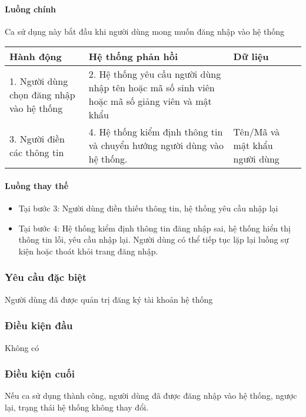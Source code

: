 \documentclass[./../main_file.tex]{subfiles}
\begin{document}
		\paragraph{Luồng chính}
		
		Ca sử dụng này bắt đầu khi người dùng mong muốn đăng nhập vào hệ thống
		\begin{longtable}{|p{}|p{}|p{}|}

				\hline
				\textbf{Hành động}                        & \textbf{Hệ thống phản hồi}                                                                    & \textbf{Dữ liệu}              
				\\ \hline
				1. Người dùng chọn đăng nhập vào hệ thống & 2. Hệ thống yêu cầu người dùng nhập tên hoặc mã số sinh viên hoặc mã số giảng viên và mật khẩu &                               
				\\ \hline
				3. Người điền các thông tin               & 4. Hệ thống kiểm định thông tin và chuyển hướng người dùng vào hệ thống.                      & Tên/Mã và mật khẩu người dùng 
				\\ \hline
				
		\end{longtable}
		\paragraph{Luồng thay thế}
		\begin{itemize}
			\item Tại bước 3: Người dùng điền thiếu thông tin, hệ thống yêu cầu nhập lại
			\item Tại bước 4:  Hệ thống kiểm định thông tin đăng nhập sai, hệ thống hiển thị thông tin lỗi, yêu cầu nhập lại. Người dùng có thể tiếp tục lặp lại luồng sự kiện hoặc thoát khỏi trang đăng nhập.
			
		\end{itemize}
	\subsubsection{Yêu cầu đặc biệt}
	Người dùng đã được quản trị đăng ký tài khoản hệ thống
	
	\subsubsection{Điều kiện đầu}
	Không có
	
	\subsubsection{Điều kiện cuối}
	Nếu ca sử dụng thành công, người dùng đã được đăng nhập vào hệ thống, ngược lại, trạng thái hệ thống không thay đổi.
\end{document}
